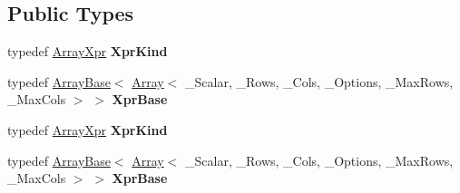 \subsection*{Public Types}
\begin{DoxyCompactItemize}
\item 
\mbox{\label{struct_eigen_1_1internal_1_1traits_3_01_array_3_01___scalar_00_01___rows_00_01___cols_00_01___ope9eba6bf714e124241d092a6dc222cb7_abb5cac484560c0fa7f7dc3d11c46e60c}} 
typedef \hyperlink{struct_eigen_1_1_array_xpr}{Array\+Xpr} {\bfseries Xpr\+Kind}
\item 
\mbox{\label{struct_eigen_1_1internal_1_1traits_3_01_array_3_01___scalar_00_01___rows_00_01___cols_00_01___ope9eba6bf714e124241d092a6dc222cb7_a5b5c49c6d0c55ea8e63ba9cd126ff1f1}} 
typedef \hyperlink{group___core___module_class_eigen_1_1_array_base}{Array\+Base}$<$ \hyperlink{group___core___module_class_eigen_1_1_array}{Array}$<$ \+\_\+\+Scalar, \+\_\+\+Rows, \+\_\+\+Cols, \+\_\+\+Options, \+\_\+\+Max\+Rows, \+\_\+\+Max\+Cols $>$ $>$ {\bfseries Xpr\+Base}
\item 
\mbox{\label{struct_eigen_1_1internal_1_1traits_3_01_array_3_01___scalar_00_01___rows_00_01___cols_00_01___ope9eba6bf714e124241d092a6dc222cb7_abb5cac484560c0fa7f7dc3d11c46e60c}} 
typedef \hyperlink{struct_eigen_1_1_array_xpr}{Array\+Xpr} {\bfseries Xpr\+Kind}
\item 
\mbox{\label{struct_eigen_1_1internal_1_1traits_3_01_array_3_01___scalar_00_01___rows_00_01___cols_00_01___ope9eba6bf714e124241d092a6dc222cb7_a5b5c49c6d0c55ea8e63ba9cd126ff1f1}} 
typedef \hyperlink{group___core___module_class_eigen_1_1_array_base}{Array\+Base}$<$ \hyperlink{group___core___module_class_eigen_1_1_array}{Array}$<$ \+\_\+\+Scalar, \+\_\+\+Rows, \+\_\+\+Cols, \+\_\+\+Options, \+\_\+\+Max\+Rows, \+\_\+\+Max\+Cols $>$ $>$ {\bfseries Xpr\+Base}
\end{DoxyCompactItemize}


